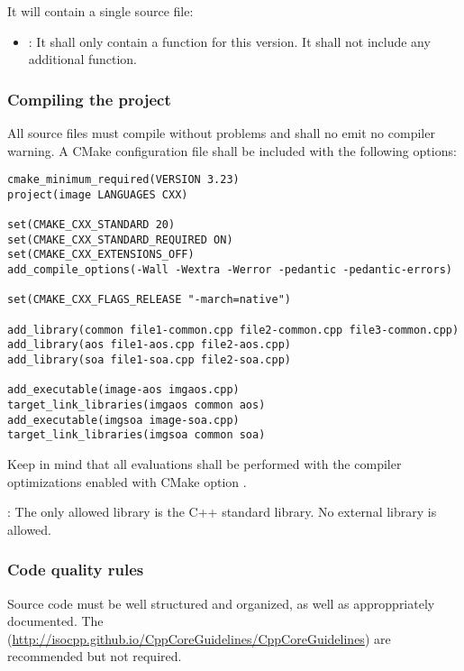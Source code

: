 It will contain a single source file:
\begin{itemize}
  \item {}: 
        It shall only contain a  function for this version.
        It shall not include any additional function.
\end{itemize}

\subsubsection{Compiling the project}

All source files must compile without problems and shall no emit no compiler warning.
A CMake configuration file shall be included with the following options:

\begin{lstlisting}[title={CmakeLists.txt},frame=single]
cmake_minimum_required(VERSION 3.23)
project(image LANGUAGES CXX)

set(CMAKE_CXX_STANDARD 20)
set(CMAKE_CXX_STANDARD_REQUIRED ON)
set(CMAKE_CXX_EXTENSIONS_OFF)
add_compile_options(-Wall -Wextra -Werror -pedantic -pedantic-errors)

set(CMAKE_CXX_FLAGS_RELEASE "-march=native")

add_library(common file1-common.cpp file2-common.cpp file3-common.cpp)
add_library(aos file1-aos.cpp file2-aos.cpp)
add_library(soa file1-soa.cpp file2-soa.cpp)

add_executable(image-aos imgaos.cpp)
target_link_libraries(imgaos common aos)
add_executable(imgsoa image-soa.cpp)
target_link_libraries(imgsoa common soa)
\end{lstlisting}

Keep in mind that all evaluations shall be performed with the compiler optimizations
enabled with CMake option
.


: 
The only allowed library is the C++ standard library.
No external library is allowed.

\subsubsection{Code quality rules}

Source code must be well structured and organized, 
as well as approppriately documented.
The 
(\url{http://isocpp.github.io/CppCoreGuidelines/CppCoreGuidelines})
are recommended but not required.

